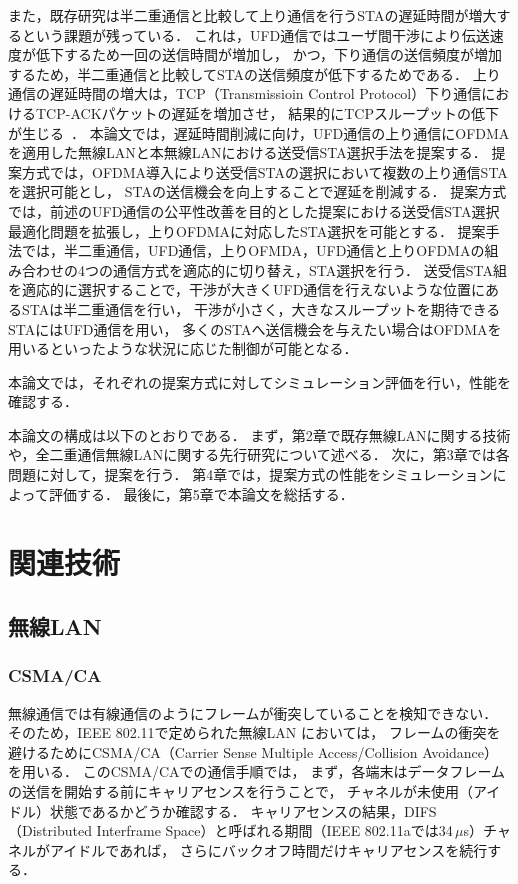 \documentclass[master]{kuisthesis}		%
\begin{document}
\par
また，既存研究は半二重通信と比較して上り通信を行うSTAの遅延時間が増大するという課題が残っている．
これは，UFD通信ではユーザ間干渉により伝送速度が低下するため一回の送信時間が増加し，
かつ，下り通信の送信頻度が増加するため，半二重通信と比較してSTAの送信頻度が低下するためである．
上り通信の遅延時間の増大は，TCP（Transmissioin Control Protocol）下り通信におけるTCP-ACKパケットの遅延を増加させ，
結果的にTCPスループットの低下が生じる~\cite{rtt}．
本論文では，遅延時間削減に向け，UFD通信の上り通信にOFDMAを適用した無線LANと本無線LANにおける送受信STA選択手法を提案する．
提案方式では，OFDMA導入により送受信STAの選択において複数の上り通信STAを選択可能とし，
STAの送信機会を向上することで遅延を削減する．
提案方式では，前述のUFD通信の公平性改善を目的とした提案における送受信STA選択最適化問題を拡張し，上りOFDMAに対応したSTA選択を可能とする．
提案手法では，半二重通信，UFD通信，上りOFMDA，UFD通信と上りOFDMAの組み合わせの4つの通信方式を適応的に切り替え，STA選択を行う．
送受信STA組を適応的に選択することで，干渉が大きくUFD通信を行えないような位置にあるSTAは半二重通信を行い，
干渉が小さく，大きなスループットを期待できるSTAにはUFD通信を用い，
多くのSTAへ送信機会を与えたい場合はOFDMAを用いるといったような状況に応じた制御が可能となる．
\par
本論文では，それぞれの提案方式に対してシミュレーション評価を行い，性能を確認する．
\par
本論文の構成は以下のとおりである．
まず，第2章で既存無線LANに関する技術や，全二重通信無線LANに関する先行研究について述べる．
次に，第3章では各問題に対して，提案を行う．
第4章では，提案方式の性能をシミュレーションによって評価する．
最後に，第5章で本論文を総括する．

\section{関連技術}
	\subsection{無線LAN}
		\subsubsection{CSMA/CA}
			無線通信では有線通信のようにフレームが衝突していることを検知できない．
			そのため，{IEEE} 802.11で定められた無線LAN においては，
			フレームの衝突を避けるためにCSMA/CA（Carrier Sense Multiple Access/Collision Avoidance）を用いる\cite{mori}．
			このCSMA/CAでの通信手順では，
			まず，各端末はデータフレームの送信を開始する前にキャリアセンスを行うことで，
			チャネルが未使用（アイドル）状態であるかどうか確認する．
			キャリアセンスの結果，DIFS（Distributed Interframe Space）と呼ばれる期間（IEEE 802.11aでは34\,$\mu$s）チャネルがアイドルであれば，
			さらにバックオフ時間だけキャリアセンスを続行する．
\end{document}
